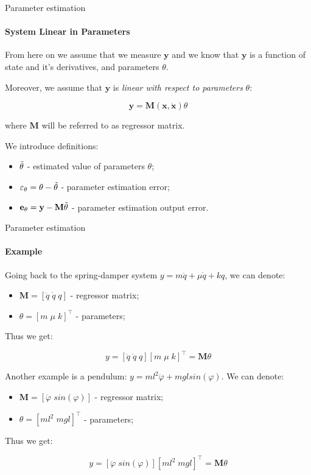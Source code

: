 \documentclass{beamer}
\begin{document}
\begin{frame}{Parameter estimation}
\framesubtitle{System Linear in Parameters}
\begin{flushleft}

From here on we assume that we measure $\mathbf y$ and we know that $\mathbf y$ is a function of state and it's derivatives, and parameters $\theta$. 

Moreover, we assume that $\mathbf y$ is \emph{linear with respect to parameters} $\theta$:

\[
\mathbf y = \mathbf M (\mathbf x, \dot {\mathbf x}) \theta
\]

where $\mathbf M$ will be referred to as regressor matrix.

\bigskip

We introduce definitions:

\begin{itemize}
    \item $\Tilde{\theta}$ - estimated value of parameters $\theta$;
    \item $\varepsilon_{\theta} = \theta - \Tilde{\theta}$ - parameter estimation error;
    \item $\mathbf e_{\theta} = \mathbf y - \mathbf M \Tilde{\theta}$ - parameter estimation output error.
\end{itemize}

\end{flushleft}
\end{frame}

\begin{frame}{Parameter estimation}
\framesubtitle{Example}
\begin{flushleft}

Going back to the spring-damper system $y = m \ddot q + \mu \dot q + k q$, we can denote:

\begin{itemize}
    \item $\mathbf M = [\ddot q \; \dot q \; q]$ - regressor matrix;
    \item $\theta = [m \; \mu \; k]^\top$ - parameters;
\end{itemize}

Thus we get:

\[
y = [\ddot q \; \dot q \; q] [m \; \mu \; k]^\top = \mathbf M \theta
\]

Another example is a pendulum: $y = m l^2 \ddot \varphi + m g l sin(\varphi)$. We can denote:
\begin{itemize}
    \item $\mathbf M = [\ddot \varphi \; sin(\varphi)]$ - regressor matrix;
    \item $\theta = [m l^2 \; m g l]^\top$ - parameters;
\end{itemize}
Thus we get:

\[
y = [\ddot \varphi \; sin(\varphi)] [m l^2 \; m g l]^\top = \mathbf M \theta
\]


\end{flushleft}
\end{frame}
\end{document}
